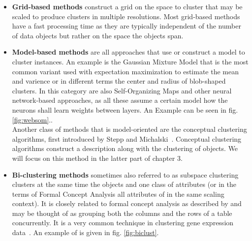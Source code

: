 \begin{itemize}
    \item \textbf{Grid-based methods} construct a grid on the space to cluster that may be scaled to produce clusters in multiple resolutions. Most grid-based methods have a fast processing time as they are typically independent of the number of data objects but rather on the space the objects span.
    \item \textbf{Model-based methods} are all approaches that use or construct a model to cluster instances. An example is the Gaussian Mixture Model that is the most common variant used with expectation maximization to estimate the mean and varience or in different terms the center and radius of blob-shaped clusters. In this category are also Self-Organizing Maps and other neural network-based approaches, as all these assume a certain model how the neurons shall learn weights between layers. An Example can be seen in fig. \ref{fig:websom}.. \\
    Another class of methods that is model-oriented are the conceptual clustering algorithms, first introduced by Stepp and Michalski~\cite{michalski1983learning}. Conceptual clustering algorithms construct a description along with the clustering of objects. We will focus on this method in the latter part of chapter 3.
    \item \textbf{Bi-clustering methods} sometimes also referred to as subspace clustering clusters at the same time the objects and one class of attributes (or in the terms of Formal Concept Analysis all attributes of in the same scaling context). It is closely related to formal concept analysis as described by\cite{ignatov2012concept} and may be thought of as grouping both the columns and the rows of a table concurrently. It is a very common technique in clustering gene expression data~\cite{PONTES2015163}. An example of is given in fig. \ref{fig:biclust}. 
\end{itemize}


